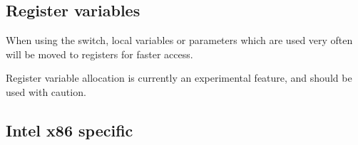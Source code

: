 \subsection{Register variables}

When using the  switch, local variables or parameters
which are used very often will be moved to registers for faster
access.

\begin{remark}Register variable allocation is currently an experimental feature,
and should be used with caution.
\end{remark}

\subsection{Intel x86 specific}

